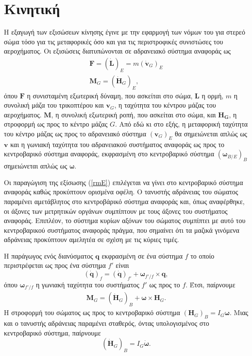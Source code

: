 \section{Κινητική}
Η εξαγωγή των εξισώσεων κίνησης έγινε με την εφαρμογή των νόμων του 
\cite{natsiavas} για στερεό σώμα τόσο για τις μεταφορικές όσο και για τις 
περιστροφικές συνιστώσες του αεροχήματος. Οι εξισώσεις διατυπώνονται σε 
αδρανειακό σύστημα αναφοράς ως
\begin{gather}
    \mathbf{F} = \mathbf{(\dot L)}_{E} = m (\mathbf{{\dot v}}_G)_{E}
    \label{tmE1} \\
    \mathbf{M}_G = (\mathbf{{\dot H}}_G)_{E},
    \label{rmE}
\end{gather}
όπου \(\mathbf{F}\) η συνισταμένη εξωτερική δύναμη, που ασκείται στο σώμα,
\(\mathbf{L}\) η ορμή, \(m\) η συνολική μάζα του τρικοπτέρου και
\(\mathbf{{v}}_G\), η ταχύτητα του κέντρου μάζας του αεροχήματος. \(\mathbf{M}\),
η συνολική εξωτερική ροπή, που ασκείται στο σώμα, και \(\mathbf{H_G}\), η 
στροφορμή ως προς το κέντρο μάζας \(G\). Από εδώ κι στο εξής, η μεταφορική 
ταχύτητα του κέντρο μάζας ως προς το αδρανειακό σύστημα $(\mathbf{v}_G)_E$ θα 
σημειώνεται απλώς ως $\mathbf{v}$ και η γωνιακή ταχύτητα του αδρανειακού 
συστήματος αναφοράς ως προς το κεντροβαρικό σύστημα αναφοράς, εκφρασμένη στο 
κεντροβαρικό σύστημα $(\bm{\omega}_{B\!/E})_B$ σημειώνεται απλώς ως $\bm{\omega}
$.

Οι παραγώγιση της εξίσωσης (\ref{rmE}) επιλέγεται να γίνει στο κεντροβαρικό 
σύστημα αναφοράς καθώς προκύπτουν ορισμένα οφέλη. Ο τανυστής αδράνειας του 
σώματος παραμένει αμετάβλητος στο κεντροβάρικό σύστημα αναφοράς και, όπως 
αναφέρθηκε, οι άξονες των μετρητικών οργάνων συμπίπτουν με τους άξονες του 
συστήματος αναφοράς. Επιπλέον, το σύστημα κυρίων αξόνων του σώματος συμπίπτει με 
αυτό του κεντροβαρικού συστήματος αναφοράς πράγμα, που σημαίνει ότι τα μαζικά 
γινόμενα αδράνειας προκύπτουν αμελητέα σε σχέση με τις κύριες τιμές.

Η παράγωγος ενός διανύσματος \(\mathbf{q}\) εκφρασμένη σε ένα σύστημα \(f\) το
οποίο περιστρέφεται ως προς ένα σύστημα \(f'\) είναι
\begin{equation}
    (\mathbf{\dot q})_f = (\mathbf{\dot q})_{f'} + \bm{\omega}_{f'\!/f}
    \times \mathbf{q},
\end{equation}
όπου \(\bm{\omega}_{f'\!/f} \) η γωνιακή ταχύτητα του συστήματος \(f'\)
ως προς το \(f\).  Έτσι, παίρνουμε
\begin{gather*}
    \mathbf{M}_G = (\mathbf{{\dot H}}_G)_{B} + \bm{\omega}
    \times \mathbf{H}_G.
\end{gather*}
Η στροφορμή του σώματος ως προς το κεντροβαρικό σύστημα $( \mathbf{H}_G)_{B} = 
I_G \bm{\omega}$. Μιας και ο τανυστής αδράνειας παραμένει σταθερός, όντας 
υπολογισμένος στο κεντροβαρικό σύστημα, παίρνουμε
\begin{equation*}
    (\mathbf{\dot H}_G)_B = I_G \dot{\bm{\omega}}.
\end{equation*}

